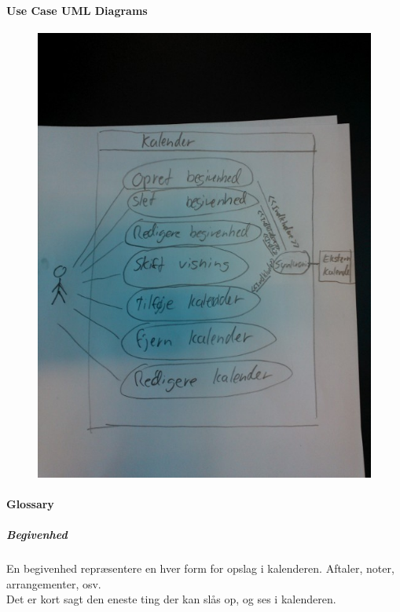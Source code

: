 \documentclass{article}
\begin{document}
   \newpage 
   \paragraph{Use Case UML Diagrams} \mbox{}

   
   \begin{figure}[h]
	\caption{}   
   \centering
   \includegraphics[scale=1.5]{WP_000143.jpg}
   \end{figure}
   
   \paragraph{Glossary} \mbox{}
	\subparagraph{Begivenhed} \mbox{}
	
	En begivenhed repræsentere en hver form for opslag i kalenderen. Aftaler, noter, arrangementer, osv. \\
	Det er kort sagt den eneste ting der kan slås op, og ses i kalenderen.
	
\end{document}
